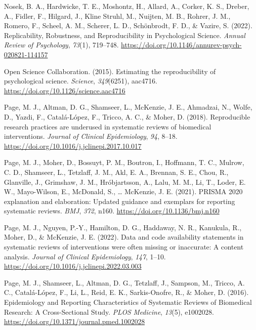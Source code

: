 \documentclass[
  ,man,floatsintext]{apa6}
\newlength{\cslhangindent}
\newlength{\cslentryspacingunit} %
\newenvironment{CSLReferences}[2] %
 {%
  \setlength{\parindent}{0pt}
  \ifodd #1
  \let\oldpar\par
  \def\par{\hangindent=\cslhangindent\oldpar}
  \fi
  \setlength{\parskip}{#2\cslentryspacingunit}
 }%
 {}
\begin{document}
\begin{CSLReferences}{1}{0}
\leavevmode{}%
Nosek, B. A., Hardwicke, T. E., Moshontz, H., Allard, A., Corker, K. S., Dreber, A., Fidler, F., Hilgard, J., Kline Struhl, M., Nuijten, M. B., Rohrer, J. M., Romero, F., Scheel, A. M., Scherer, L. D., Schönbrodt, F. D., \& Vazire, S. (2022). Replicability, {Robustness}, and {Reproducibility} in {Psychological Science}. \emph{Annual Review of Psychology}, \emph{73}(1), 719--748. \url{https://doi.org/10.1146/annurev-psych-020821-114157}

\leavevmode{}%
Open Science Collaboration. (2015). Estimating the reproducibility of psychological science. \emph{Science}, \emph{349}(6251), aac4716. \url{https://doi.org/10.1126/science.aac4716}

\leavevmode{}%
Page, M. J., Altman, D. G., Shamseer, L., McKenzie, J. E., Ahmadzai, N., Wolfe, D., Yazdi, F., Catalá-López, F., Tricco, A. C., \& Moher, D. (2018). Reproducible research practices are underused in systematic reviews of biomedical interventions. \emph{Journal of Clinical Epidemiology}, \emph{94}, 8--18. \url{https://doi.org/10.1016/j.jclinepi.2017.10.017}

\leavevmode{}%
Page, M. J., Moher, D., Bossuyt, P. M., Boutron, I., Hoffmann, T. C., Mulrow, C. D., Shamseer, L., Tetzlaff, J. M., Akl, E. A., Brennan, S. E., Chou, R., Glanville, J., Grimshaw, J. M., Hróbjartsson, A., Lalu, M. M., Li, T., Loder, E. W., Mayo-Wilson, E., McDonald, S., \ldots{} McKenzie, J. E. (2021). {PRISMA} 2020 explanation and elaboration: Updated guidance and exemplars for reporting systematic reviews. \emph{BMJ}, \emph{372}, n160. \url{https://doi.org/10.1136/bmj.n160}

\leavevmode{}%
Page, M. J., Nguyen, P.-Y., Hamilton, D. G., Haddaway, N. R., Kanukula, R., Moher, D., \& McKenzie, J. E. (2022). Data and code availability statements in systematic reviews of interventions were often missing or inaccurate: A content analysis. \emph{Journal of Clinical Epidemiology}, \emph{147}, 1--10. \url{https://doi.org/10.1016/j.jclinepi.2022.03.003}

\leavevmode{}%
Page, M. J., Shamseer, L., Altman, D. G., Tetzlaff, J., Sampson, M., Tricco, A. C., Catalá-López, F., Li, L., Reid, E. K., Sarkis-Onofre, R., \& Moher, D. (2016). Epidemiology and {Reporting} {Characteristics} of {Systematic} {Reviews} of {Biomedical} {Research}: {A} {Cross}-{Sectional} {Study}. \emph{PLOS Medicine}, \emph{13}(5), e1002028. \url{https://doi.org/10.1371/journal.pmed.1002028}


\end{CSLReferences}
\end{document}
